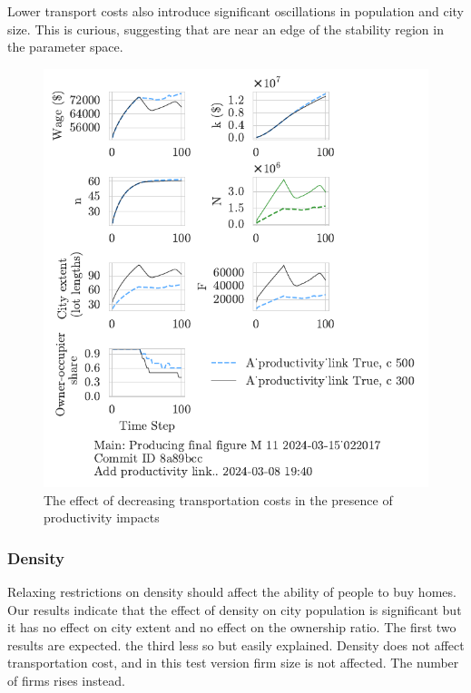 Lower transport costs also introduce significant oscillations in population and city size. This is curious, suggesting that are  near an edge of the stability region in the parameter space.



\begin{figure}[h!t]
    \centering
    \includegraphics[scale=.8, trim={0 1.4cm 0 0},clip]{fig/With-productivity_link-c-15_022017.pdf}
    \caption{The effect of decreasing transportation costs in the presence of productivity impacts}
    \label{fig:Productivity_link_and_c_ownership_trajectory}
\end{figure}


\newpage
\subsubsection{Density}
Relaxing restrictions on density should affect the ability of people to buy homes. Our results indicate that the effect of density on city population is significant but it has no effect on city extent and no effect on the ownership ratio. The first two results are expected. the third less so but easily explained. Density does not affect transportation cost, and in this test version firm size is not affected. The number of firms rises instead. 

